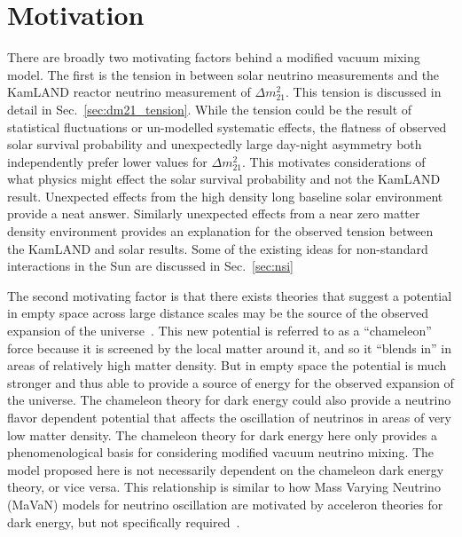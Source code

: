 \section{Motivation}
\label{sec:motivations}
There are broadly two motivating factors behind a modified vacuum mixing model.
The first is the tension in between solar neutrino measurements and 
the KamLAND reactor neutrino measurement of $\Delta m^{2}_{21}$.
This tension is discussed in detail in Sec.~\ref{sec:dm21_tension}.
While the tension could be the result of statistical fluctuations or un-modelled
systematic effects, the flatness of observed solar survival probability and
unexpectedly large day-night asymmetry both independently prefer lower values
for $\Delta m^{2}_{21}$.
This motivates considerations of what physics might effect the solar survival
probability and not the KamLAND result.
Unexpected effects from the high density long baseline solar environment provide a neat answer.
Similarly unexpected effects from a near zero matter density environment
provides an explanation for the observed tension between the KamLAND and solar
results.
Some of the existing ideas for non-standard interactions in the Sun are discussed
in Sec.~\ref{sec:nsi}

The second motivating factor is that there exists theories that
suggest a potential in empty space across large distance scales may be the source
of the observed expansion of the universe~\cite{khoury_chameleons}.
This new potential is referred to as a ``chameleon'' force because it
is screened by the local matter around it, and so it ``blends in'' in
areas of relatively high matter density.
But in empty space the potential is much stronger and thus able to provide
a source of energy for the observed expansion of the universe.
The chameleon theory for dark energy could also provide a neutrino flavor dependent
potential that affects the oscillation of neutrinos in areas of very low matter
density.
The chameleon theory for dark energy here only provides a phenomenological basis
for considering modified vacuum neutrino mixing. The model proposed here is
not necessarily dependent on the chameleon dark energy theory, or vice versa.
This relationship is similar to how Mass Varying Neutrino (MaVaN) models
for neutrino oscillation are motivated by acceleron theories for dark energy,
but not specifically required~\cite{mavans_cosmology}.


